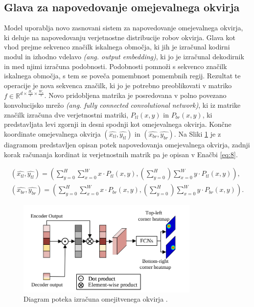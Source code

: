 \documentclass[a4paper,12pt,openright]{book}
\begin{document}
\subsection{Glava za napovedovanje omejevalnega okvirja}
Model uporablja novo zasnovani sistem za napovedovanje omejevalnega ok\-virja, ki deluje na napovedovanju verjetnostne distribucije robov okvirja. Glava kot vhod prejme sekvenco značilk iskalnega območja, ki jih je izračunal kodirni modul in izhodno vdelavo \emph{(ang. output embedding)}, ki jo je izračunal dekodirnik in med njimi izračuna podobnosti. Podobnosti pomnoži s sekvenco značilk iskalnega območja, s tem se poveča pomembnost pomembnih regij. Rezultat te operacije je nova sekvenca značilk, ki jo je potrebno preoblikovati v matriko $ f \in \mathbb{R}^{d \times \frac{H_s}{s} \times \frac{W_s}{s}} $. Novo pridobljena matrika je posredovana v polno povezano konvolucijsko mrežo \emph{(ang. fully connected convolutional network)}, ki iz matrike značilk izračuna dve verjetnostni matriki, $ P_{tl}(x,y) $ in  $ P_{br}(x,y) $, ki predstavljata levi zgornji in desni spodnji kot omejevalnega okvirja. Končne koordinate omejevalnega okvirja $ (\hat{x_{tl}}, \hat{y_{tl}}) $ in $ (\hat{x_{br}}, \hat{y_{br}}) $. Na Sliki \ref{img:bbox_head} je z diagramom predstavljen opisan potek napovedovanja omejevalnega okvirja, zadnji korak računanja kordinat iz verjetnostnih matrik pa je opisan v Enačbi \ref{eq:8}.

\begin{equation}
    \begin{split}
        (\hat{x_{tl}}, \hat{y_{tl}}) = (\sum_{y=0}^{H} \sum_{x=0}^{W} x \cdot P_{tl}(x,y), (\sum_{y=0}^{H}) \sum_{x=0}^{W} y \cdot P_{tl}(x,y)), \\
        (\hat{x_{br}}, \hat{y_{br}}) = (\sum_{y=0}^{H} \sum_{x=0}^{W} x \cdot P_{br}(x,y), (\sum_{y=0}^{H}) \sum_{x=0}^{W} y \cdot P_{br}(x,y)).
    \end{split}
    \label{eq:8}
\end{equation}

\begin{figure}[htb]
    \begin{center}
        \includegraphics[width=0.8\textwidth]{img/bbox_head.png}
    \end{center}
    \caption{Diagram poteka izračuna omejitvenega okvirja \cite{attention_is_all_you_need}.}
    \label{img:bbox_head}
\end{figure}
\end{document}
